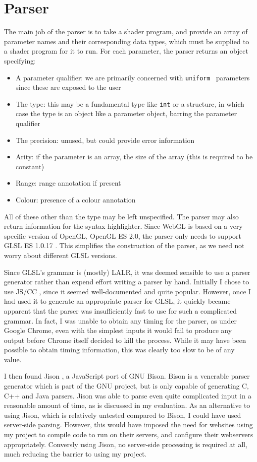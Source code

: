 \documentclass[12pt,twoside,notitlepage]{report}
\begin{document}
\section{Parser}
The main job of the parser is to take a shader program, and provide an array of parameter names and their corresponding data types, which must be supplied to a shader program for it to run. For each parameter, the parser returns an object specifying:
\begin{itemize}
  \item A parameter qualifier: we are primarily concerned with {\tt uniform } parameters since these are exposed to the user
  \item The type: this may be a fundamental type like {\tt int} or a structure, in which case the type is an object like a parameter object, barring the parameter qualifier
  \item The precision: unused, but could provide error information
  \item Arity: if the parameter is an array, the size of the array (this is required to be constant)
  \item Range: range annotation if present
  \item Colour: presence of a colour annotation
\end{itemize}
All of these other than the type may be left unspecified. The parser may also return information for the syntax highlighter. Since WebGL is based on a very specific version of OpenGL, OpenGL ES 2.0, the parser only needs to support GLSL ES 1.0.17 \cite{glsl-spec}\cite{webgl-spec}. This simplifies the construction of the parser, as we need not worry about different GLSL versions.

Since GLSL's grammar is (mostly) LALR, it was deemed sensible to use a parser generator rather than expend  effort writing a parser by hand. Initially I chose to use JS/CC \cite{js-cc}, since it seemed well-documented and quite popular. However, once I had used it to generate an appropriate parser for GLSL, it quickly became apparent that the parser was insufficiently fast to use for such a complicated grammar. In fact, I was unable to obtain any timing for the parser, as under Google Chrome, even with the simplest inputs it would fail to produce any output before Chrome itself decided to kill the process. While it may have been possible to obtain timing information, this was clearly too slow to be of any value. 

I then found Jison \cite{jison}, a JavaScript port of GNU Bison. Bison is a venerable parser generator which is part of the GNU project, but is only capable of generating C, C++ and Java parsers.  Jison was able to parse even quite complicated input in a reasonable amount of time, as is discussed in my evaluation. As an alternative to using Jison, which is relatively untested compared to Bison, I could have used server-side parsing. However, this would have imposed the need for websites using my project to compile code to run on their servers, and configure their webservers appropriately. Conversly using Jison, no server-side processing is required at all, much reducing the barrier to using my project.
\end{document}
